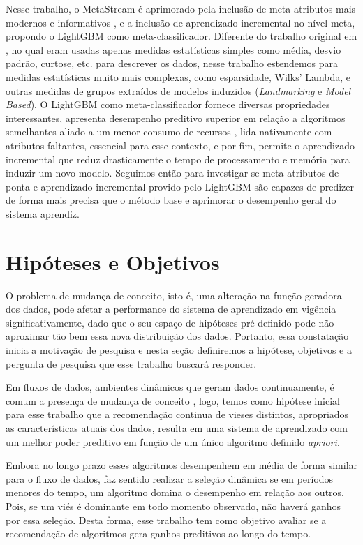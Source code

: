 Nesse trabalho, o MetaStream é aprimorado pela inclusão de meta-atributos mais modernos e informativos \cite{Rivolli2018}, e a inclusão de aprendizado incremental no nível meta, propondo o  LightGBM \cite{ke2017lightgbm} como meta-classificador. Diferente do trabalho original em \cite{rossi2014metastream}, no qual eram usadas apenas medidas estatísticas simples como média, desvio padrão, curtose, etc. para descrever os dados, nesse trabalho estendemos para medidas estatísticas muito mais complexas, como esparsidade, Wilks' Lambda, e outras medidas de grupos extraídos de modelos induzidos (\textit{Landmarking} e \textit{Model Based}). O LightGBM como meta-classificador fornece diversas propriedades interessantes, apresenta desempenho preditivo superior em relação a algoritmos semelhantes aliado a um menor consumo de recursos \cite{lightgbmBench}, lida nativamente com atributos faltantes, essencial para esse contexto, e por fim, permite o aprendizado incremental que reduz drasticamente o tempo de processamento e memória para induzir um novo modelo. Seguimos então para investigar se meta-atributos de ponta e aprendizado incremental provido pelo LightGBM são capazes de predizer de forma mais precisa que o método base e aprimorar o desempenho geral do sistema aprendiz.


\section{Hipóteses e Objetivos}

O problema de mudança de conceito, isto é, uma alteração na função geradora dos dados, pode afetar a performance do sistema de aprendizado em vigência significativamente, dado que o seu espaço de hipóteses pré-definido pode não aproximar tão bem essa nova distribuição dos dados. Portanto, essa constatação inicia a motivação de pesquisa e nesta seção definiremos a hipótese, objetivos e a pergunta de pesquisa que esse trabalho buscará responder.

Em fluxos de dados, ambientes dinâmicos que geram dados continuamente, é comum a presença de mudança de conceito \cite{domingos2000mining}, logo, temos como hipótese inicial para esse trabalho que a recomendação continua de vieses distintos, apropriados as características atuais dos dados, resulta em uma sistema de aprendizado com um melhor poder preditivo em função de um único algoritmo definido \textit{apriori}.

Embora no longo prazo esses algoritmos desempenhem em média de forma similar para o fluxo de dados, faz sentido realizar a seleção dinâmica se em períodos menores do tempo, um algoritmo domina o desempenho em relação aos outros. Pois, se um viés é dominante em todo momento observado, não haverá ganhos por essa seleção. Desta forma, esse trabalho tem como objetivo avaliar se a recomendação de algoritmos gera ganhos preditivos ao longo do tempo.

